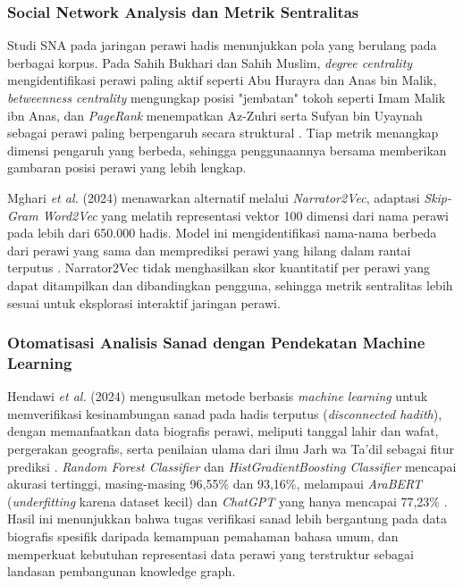 \subsubsection{Social Network Analysis dan Metrik Sentralitas}

\begin{sloppypar}
Studi SNA pada jaringan perawi hadis menunjukkan pola yang berulang pada berbagai korpus. Pada Sahih Bukhari dan Sahih Muslim, \textit{degree centrality} mengidentifikasi perawi paling aktif seperti Abu Hurayra dan Anas bin Malik, \textit{betweenness centrality} mengungkap posisi "jembatan" tokoh seperti Imam Malik ibn Anas, dan \textit{PageRank} menempatkan Az-Zuhri serta Sufyan bin Uyaynah sebagai perawi paling berpengaruh secara struktural \cite{Mghari2024Narrator2Vec}. Tiap metrik menangkap dimensi pengaruh yang berbeda, sehingga penggunaannya bersama memberikan gambaran posisi perawi yang lebih lengkap.

Mghari \textit{et al.} (2024) menawarkan alternatif melalui \textit{Narrator2Vec}, adaptasi \textit{Skip-Gram Word2Vec} yang melatih representasi vektor 100 dimensi dari nama perawi pada lebih dari 650.000 hadis. Model ini mengidentifikasi nama-nama berbeda dari perawi yang sama dan memprediksi perawi yang hilang dalam rantai terputus \cite{Mghari2024Narrator2Vec}. Narrator2Vec tidak menghasilkan skor kuantitatif per perawi yang dapat ditampilkan dan dibandingkan pengguna, sehingga metrik sentralitas lebih sesuai untuk eksplorasi interaktif jaringan perawi.
\end{sloppypar}

\subsubsection{Otomatisasi Analisis Sanad dengan Pendekatan Machine Learning}

Hendawi \textit{et al.} (2024) mengusulkan metode berbasis \textit{machine learning} untuk memverifikasi kesinambungan sanad pada hadis terputus (\textit{disconnected hadith}), dengan memanfaatkan data biografis perawi, meliputi tanggal lahir dan wafat, pergerakan geografis, serta penilaian ulama dari ilmu Jarh wa Ta'dil sebagai fitur prediksi \cite{10974901}. \textit{Random Forest Classifier} dan \textit{HistGradientBoosting Classifier} mencapai akurasi tertinggi, masing-masing 96,55\% dan 93,16\%, melampaui \textit{AraBERT} (\textit{underfitting} karena dataset kecil) dan \textit{ChatGPT} yang hanya mencapai 77,23\% \cite{10974901}. Hasil ini menunjukkan bahwa tugas verifikasi sanad lebih bergantung pada data biografis spesifik daripada kemampuan pemahaman bahasa umum, dan memperkuat kebutuhan representasi data perawi yang terstruktur sebagai landasan pembangunan knowledge graph.

